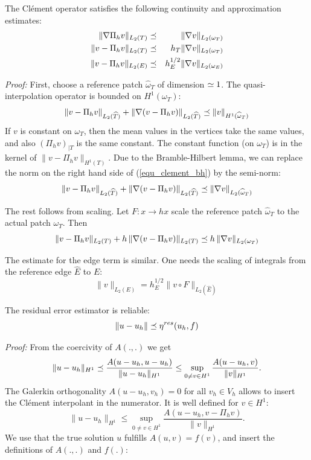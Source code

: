 \bigskip


\begin{theorem} The Cl\'ement operator satisfies the following continuity and
approximation estimates:
\begin{eqnarray*}
\| \nabla \Pi_h v \|_{L_2(T)} & \preceq & \| \nabla v \|_{L_2(\omega_T)} \\
\| v - \Pi_h v \|_{L_2(T)} & \preceq & h_T \| \nabla v \|_{L_2(\omega_T)} \\
\| v - \Pi_h v \|_{L_2(E)} & \preceq & h_E^{1/2} \| \nabla v \|_{L_2(\omega_E)} \\
\end{eqnarray*}
\end{theorem}

{\em Proof:} First, choose a reference patch $\widehat \omega_T$ of 
dimension 
$\simeq 1$. The quasi-interpolation operator is bounded on $H^1(\omega_T)$:
\begin{equation}
\label{equ_clement_bh}
\| v - \Pi_h v \|_{L_2(\widehat T)} + \| \nabla (v - \Pi_h v) \|_{L_2(\widehat T)} \preceq \| v \|_{H^1(\widehat \omega_T)}
\end{equation}
If $v$ is constant on $\omega_T$, then the mean values in the vertices
take the same values, and also $(\Pi_h v)_{|T}$ is the same constant.
The constant function (on $\omega_T$) is in the kernel of 
$\| v - \Pi_h v \|_{H^1(T)}$. Due to
the Bramble-Hilbert lemma, we can replace the norm on the right hand side
of (\ref{equ_clement_bh}) by the semi-norm:
\begin{equation}
\label{equ_clement_bh2}
\| v - \Pi_h v \|_{L_2(\widehat T)} + \| \nabla (v - \Pi_h v) \|_{L_2(\widehat T)} \preceq \| \nabla v \|_{L_2(\widehat \omega_T)}
\end{equation}

The rest follows from scaling. Let $F : x \rightarrow h x$ scale the reference patch $\widehat \omega_T$ to the actual patch $\omega_T$. Then
$$
\| v - \Pi_h v \|_{L_2(T)} + h \, \| \nabla (v-\Pi_h v) \|_{L_2(T)} \preceq h \, \| \nabla v \|_{L_2(\omega_T)}
$$

The estimate for the edge term is similar. One needs the scaling of integrals
from the reference edge $\widehat E$ to $E$:
$$
\| v \|_{L_2(E)} = h_E^{1/2} \| v \circ F \|_{L_2(\hat E)}
$$
\bigskip

\begin{theorem}The residual error estimator is reliable:
$$
\| u - u_h \| \preceq \eta^{res} (u_h, f)
$$
\end{theorem}
{\em Proof:} From the coercivity of $A(.,.)$ we get
$$
\| u - u_h \|_{H^1} \preceq \frac{A(u-u_h, u-u_h)}{ \| u-u_h \|_{H^1} } \leq 
        \sup_{0 \neq v \in H^1} \frac{A(u-u_h, v)}{ \| v \|_{H^1} }.
$$
The Galerkin orthogonality $A(u-u_h,v_h) = 0$ for all $v_h \in V_h$ allows
to insert the Cl\'ement interpolant in the numerator. It is well defined for
$v \in H^1$:
$$
\| u - u_h \|_{H^1} \leq
        \sup_{0 \neq v \in H^1} \frac{A(u-u_h, v - \Pi_h v)}{ \| v \|_{H^1} }.
$$
We use that the true solution $u$ fulfills $A(u,v) = f(v)$, and insert
the definitions of $A(.,.)$ and $f(.)$:

